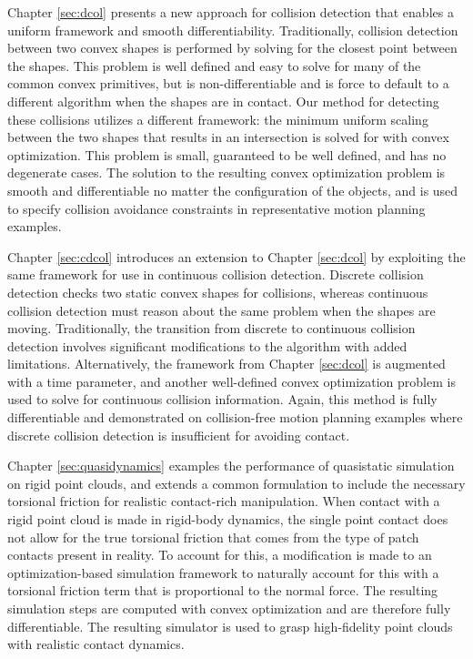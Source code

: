 Chapter \ref{sec:dcol} presents a new approach for collision detection that enables a uniform framework and smooth differentiability. Traditionally, collision detection between two convex shapes is performed by solving for the closest point between the shapes. This problem is well defined and easy to solve for many of the common convex primitives, but is non-differentiable and is force to default to a different algorithm when the shapes are in contact. Our method for detecting these collisions utilizes a different framework: the minimum uniform scaling between the two shapes that results in an intersection is solved for with convex optimization. This problem is small, guaranteed to be well defined, and has no degenerate cases. The solution to the resulting convex optimization problem is smooth and differentiable no matter the configuration of the objects, and is used to specify collision avoidance constraints in representative motion planning examples. 

Chapter \ref{sec:cdcol} introduces an extension to Chapter \ref{sec:dcol} by exploiting the same framework for use in continuous collision detection. Discrete collision detection checks two static convex shapes for collisions, whereas continuous collision detection must reason about the same problem when the shapes are moving. Traditionally, the transition from discrete to continuous collision detection involves significant modifications to the algorithm with added limitations. Alternatively, the framework from Chapter \ref{sec:dcol} is augmented with a time parameter, and another well-defined convex optimization problem is used to solve for continuous collision information. Again, this method is fully differentiable and demonstrated on collision-free motion planning examples where discrete collision detection is insufficient for avoiding contact. 

Chapter \ref{sec:quasidynamics} examples the performance of quasistatic simulation on rigid point clouds, and extends a common formulation to include the necessary torsional friction for realistic contact-rich manipulation. When contact with a rigid point cloud is made in rigid-body dynamics, the single point contact does not allow for the true torsional friction that comes from the type of patch contacts present in reality. To account for this, a modification is made to an optimization-based simulation framework to naturally account for this with a torsional friction term that is proportional to the normal force. The resulting simulation steps are computed with convex optimization and are therefore fully differentiable. The resulting simulator is used to grasp high-fidelity point clouds with realistic contact dynamics. 

